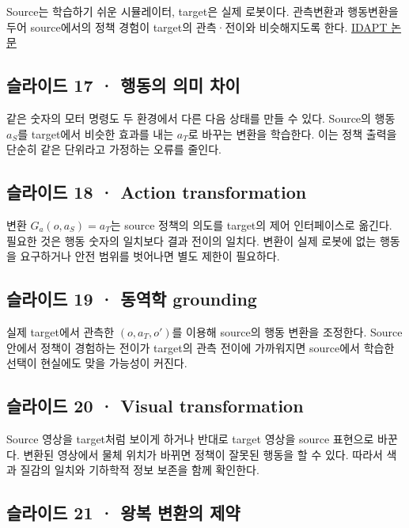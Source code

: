 \documentclass[11pt,a4paper]{article}
\begin{document}
Source는 학습하기 쉬운 시뮬레이터, target은 실제 로봇이다. 관측변환과 행동변환을 두어 source에서의 정책 경험이 target의 관측·전이와 비슷해지도록 한다. \href{https://arxiv.org/abs/2107.00339}{IDAPT 논문}\par

\subsection{슬라이드 17 · 행동의 의미 차이}

같은 숫자의 모터 명령도 두 환경에서 다른 다음 상태를 만들 수 있다. Source의 행동 $a_S$를 target에서 비슷한 효과를 내는 $a_T$로 바꾸는 변환을 학습한다. 이는 정책 출력을 단순히 같은 단위라고 가정하는 오류를 줄인다.\par

\subsection{슬라이드 18 · Action transformation}

변환 $G_a(o,a_S)=a_T$는 source 정책의 의도를 target의 제어 인터페이스로 옮긴다. 필요한 것은 행동 숫자의 일치보다 결과 전이의 일치다. 변환이 실제 로봇에 없는 행동을 요구하거나 안전 범위를 벗어나면 별도 제한이 필요하다.\par

\subsection{슬라이드 19 · 동역학 grounding}

실제 target에서 관측한 $(o,a_T,o')$를 이용해 source의 행동 변환을 조정한다. Source 안에서 정책이 경험하는 전이가 target의 관측 전이에 가까워지면 source에서 학습한 선택이 현실에도 맞을 가능성이 커진다.\par

\subsection{슬라이드 20 · Visual transformation}

Source 영상을 target처럼 보이게 하거나 반대로 target 영상을 source 표현으로 바꾼다. 변환된 영상에서 물체 위치가 바뀌면 정책이 잘못된 행동을 할 수 있다. 따라서 색과 질감의 일치와 기하학적 정보 보존을 함께 확인한다.\par

\subsection{슬라이드 21 · 왕복 변환의 제약}
\end{document}
